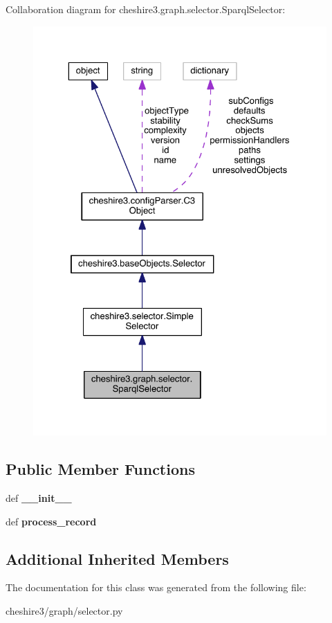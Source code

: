 Collaboration diagram for cheshire3.\-graph.\-selector.\-Sparql\-Selector\-:
\nopagebreak
\begin{figure}[H]
\begin{center}
\leavevmode
\includegraphics[width=325pt]{classcheshire3_1_1graph_1_1selector_1_1_sparql_selector__coll__graph}
\end{center}
\end{figure}
\subsection*{Public Member Functions}
\begin{DoxyCompactItemize}
\item 
\hypertarget{classcheshire3_1_1graph_1_1selector_1_1_sparql_selector_a592676c2aaa5c4b556919e853a592b22}{def {\bfseries \-\_\-\-\_\-init\-\_\-\-\_\-}}\label{classcheshire3_1_1graph_1_1selector_1_1_sparql_selector_a592676c2aaa5c4b556919e853a592b22}

\item 
\hypertarget{classcheshire3_1_1graph_1_1selector_1_1_sparql_selector_af99ddb8e170fb72ed48008a22b11b386}{def {\bfseries process\-\_\-record}}\label{classcheshire3_1_1graph_1_1selector_1_1_sparql_selector_af99ddb8e170fb72ed48008a22b11b386}

\end{DoxyCompactItemize}
\subsection*{Additional Inherited Members}


The documentation for this class was generated from the following file\-:\begin{DoxyCompactItemize}
\item 
cheshire3/graph/selector.\-py\end{DoxyCompactItemize}
